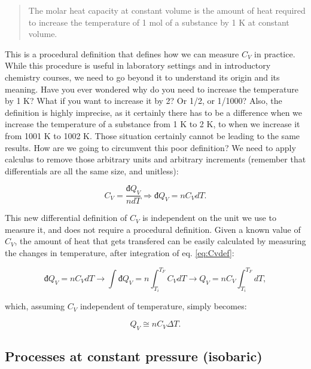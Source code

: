 \documentclass[
  9pt,
]{extbook}
\theoremstyle{definition}
\theoremstyle{definition}
\theoremstyle{definition}
\theoremstyle{remark}
\begin{document}
\begin{quote}
The molar heat capacity at constant volume is the amount of heat required to increase the temperature of 1 mol of a substance by 1 K at constant volume.
\end{quote}

This is a procedural definition that defines how we can measure \(C_V\) in practice. While this procedure is useful in laboratory settings and in introductory chemistry courses, we need to go beyond it to understand its origin and its meaning. Have you ever wondered why do you need to increase the temperature by 1 K? What if you want to increase it by 2? Or 1/2, or 1/1000? Also, the definition is highly imprecise, as it certainly there has to be a difference when we increase the temperature of a substance from 1 K to 2 K, to when we increase it from 1001 K to 1002 K. Those situation certainly cannot be leading to the same results. How are we going to circumvent this poor definition? We need to apply calculus to remove those arbitrary units and arbitrary increments (remember that differentials are all the same size, and unitless):

\begin{equation}
  C_V = \frac{đ Q_V}{n dT} \Rightarrow đ Q_V = n C_V dT.
  \label{eq:Cvdef}
\end{equation}

This new differential definition of \(C_V\) is independent on the unit we use to measure it, and does not require a procedural definition. Given a known value of \(C_V\), the amount of heat that gets transfered can be easily calculated by measuring the changes in temperature, after integration of eq. \eqref{eq:Cvdef}:

\begin{equation}
  đ Q_V = n C_V dT \rightarrow \int đ Q_V = n \int_{T_i}^{T_F}C_V dT \rightarrow Q_V = n C_V \int_{T_i}^{T_F}dT,
  \label{eq:Cvint1}
\end{equation}

which, assuming \(C_V\) independent of temperature, simply becomes:

\begin{equation}
  Q_V \cong n C_V \Delta T.
  \label{eq:Cvint}
\end{equation}

\hypertarget{heatconstp}{%
\subsection{Processes at constant pressure (isobaric)}\label{heatconstp}}
\end{document}
